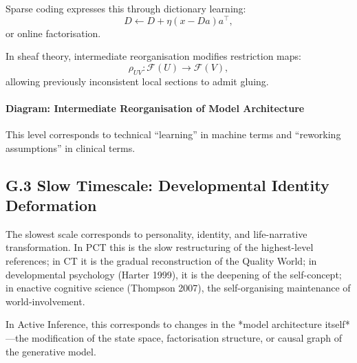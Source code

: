 \documentclass[11pt,a4paper,twoside]{article}
\begin{document}
Sparse coding expresses this through dictionary learning:
\[
D \leftarrow D + \eta (x - Da)a^\top,
\]
or online factorisation.

In sheaf theory, intermediate reorganisation modifies restriction maps:
\[
\rho_{UV}: \mathscr{F}(U) \to \mathscr{F}(V),
\]
allowing previously inconsistent local sections to admit gluing.

\paragraph{Diagram: Intermediate Reorganisation of Model Architecture}

\begin{center}
\end{center}

This level corresponds to technical “learning” in machine terms and “reworking assumptions” in clinical terms.

\subsection*{G.3 Slow Timescale: Developmental Identity Deformation}

The slowest scale corresponds to personality, identity, and life-narrative transformation. In PCT this is the slow restructuring of the highest-level references; in CT it is the gradual reconstruction of the Quality World; in developmental psychology (Harter 1999), it is the deepening of the self-concept; in enactive cognitive science (Thompson 2007), the self-organising maintenance of world-involvement.

In Active Inference, this corresponds to changes in the *model architecture itself*—the modification of the state space, factorisation structure, or causal graph of the generative model.
\end{document}
